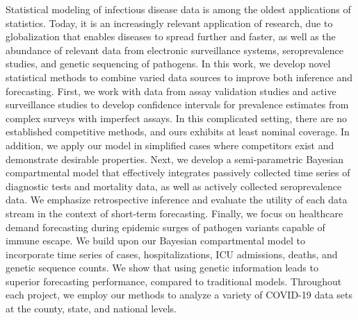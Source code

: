 {%







}

\thesisabstract
{
Statistical modeling of infectious disease data is among the oldest applications of statistics. Today, it is an increasingly relevant application of research, due to globalization that enables diseases to spread further and faster, as well as the abundance of relevant data from electronic surveillance systems, seroprevalence studies, and genetic sequencing of pathogens. In this work, we develop novel statistical methods to combine varied data sources to improve both inference and forecasting. First, we work with data from assay validation studies and active surveillance studies to develop confidence intervals for prevalence estimates from complex surveys with imperfect assays. In this complicated setting, there are no established competitive methods, and ours exhibits at least nominal coverage. In addition, we apply our model in simplified cases where competitors exist and demonstrate desirable properties. Next, we develop a semi-parametric Bayesian compartmental model that effectively integrates passively collected time series of diagnostic tests and mortality data, as well as actively collected seroprevalence data. We emphasize retrospective inference and evaluate the utility of each data stream in the context of short-term forecasting. Finally, we focus on healthcare demand forecasting during epidemic surges of pathogen variants capable of immune escape. We build upon our Bayesian compartmental model to incorporate time series of cases, hospitalizations, ICU admissions, deaths, and genetic sequence counts. We show that using genetic information leads to superior forecasting performance, compared to traditional models. Throughout each project, we employ our methods to analyze a variety of COVID-19 data sets at the county, state, and national levels.
}


